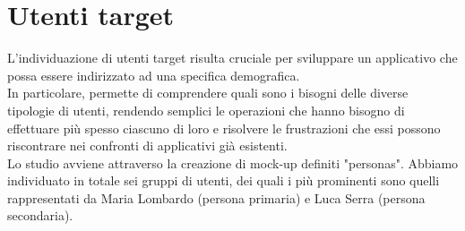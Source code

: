     \section{Utenti target}
        L'individuazione di utenti target risulta cruciale per sviluppare un applicativo che possa essere indirizzato ad una specifica demografica. \\
        In particolare, permette di comprendere quali sono i bisogni delle diverse tipologie di utenti, rendendo semplici le operazioni che hanno bisogno di effettuare più spesso ciascuno di loro e risolvere le frustrazioni che essi possono riscontrare nei confronti di applicativi già esistenti. \\
        Lo studio avviene attraverso la creazione di mock-up definiti "personas". Abbiamo individuato in totale sei gruppi di utenti, dei quali i più prominenti sono quelli rappresentati da Maria Lombardo (persona primaria) e Luca Serra (persona secondaria).
        
